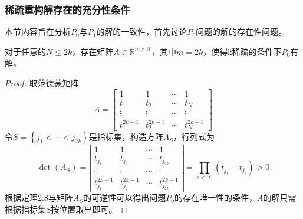 \subsubsection{稀疏重构解存在的充分性条件}
本节内容旨在分析$P_0$与$P_1$的解的一致性，首先讨论$P_0$问题的解的存在性问题。
\begin{theorem}
    对于任意的$N \le 2k$，存在矩阵$A\in \mathbb{R}^{m \times N}$，其中$m=2k$，使得k稀疏的条件下$P_0$有解。
\end{theorem}
\begin{proof}
    取范德蒙矩阵
    \begin{equation}
        A=\left[\begin{array}{cccc}
        1 & 1 & \cdots & 1 \\
        t_1 & t_2 & \cdots & t_N \\
        \vdots & \vdots & \cdots & \vdots \\
        t_1^{2 k-1} & t_2^{2 k-1} & \cdots & t_N^{2 k-1}
        \end{array}\right]
    \end{equation}
    令$S=\left\{j_1<\cdots<j_{2 k}\right\}$是指标集，构造方阵$A_S$，行列式为
    \begin{equation}
        \operatorname{det}\left(A_S\right)=\left|\begin{array}{cccc}
        1 & 1 & \cdots & 1 \\
        t_{j_1} & t_{j_2} & \cdots & t_{j_{2 k}} \\
        \vdots & \vdots & \cdots & \vdots \\
        t_{j_1}^{2 k-1} & t_{j_2}^{2 k-1} & \cdots & t_{j_{2 k}}^{2 k-1}
        \end{array}\right|=\prod_{s<\ell}\left(t_{j_{\ell}}-t_{j_s}\right)>0
    \end{equation}
    根据定理2.8与矩阵$A_S$的可逆性可以得出问题$P_0$的存在唯一性的条件，$A$的解只需根据指标集$S$按位置取出即可。
\end{proof}


